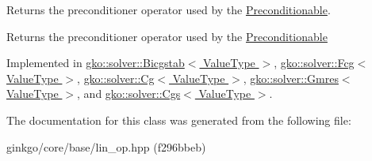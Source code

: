 Returns the preconditioner operator used by the \hyperlink{classgko_1_1Preconditionable}{Preconditionable}. 

\begin{DoxyReturn}{Returns}
the preconditioner operator used by the \hyperlink{classgko_1_1Preconditionable}{Preconditionable} 
\end{DoxyReturn}


Implemented in \hyperlink{classgko_1_1solver_1_1Bicgstab_ac16d32672fbc91d8cfd7c0607c9771db}{gko\+::solver\+::\+Bicgstab$<$ Value\+Type $>$}, \hyperlink{classgko_1_1solver_1_1Fcg_a2dec8d13548e8b316d6598c9ee8b0881}{gko\+::solver\+::\+Fcg$<$ Value\+Type $>$}, \hyperlink{classgko_1_1solver_1_1Cg_a797544ecc8d86d2798014e7f5f5baf4f}{gko\+::solver\+::\+Cg$<$ Value\+Type $>$}, \hyperlink{classgko_1_1solver_1_1Gmres_ac2e3e0024a37647eda9f8a7f5b4cefb4}{gko\+::solver\+::\+Gmres$<$ Value\+Type $>$}, and \hyperlink{classgko_1_1solver_1_1Cgs_ad349dc1381dfdcb7a47223908806dcc7}{gko\+::solver\+::\+Cgs$<$ Value\+Type $>$}.



The documentation for this class was generated from the following file\+:\begin{DoxyCompactItemize}
\item 
ginkgo/core/base/lin\+\_\+op.\+hpp (f296bbeb)\end{DoxyCompactItemize}
